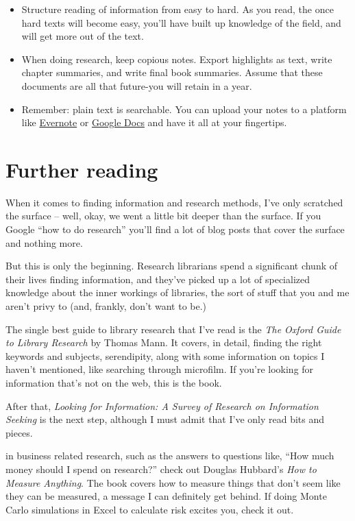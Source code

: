 \begin{itemize}
\item Structure reading of information from easy to hard. As you read, the once hard
texts will become easy, you'll have built up knowledge of the field, and will
get more out of the text.

\item When doing research, keep copious notes. Export highlights as text, write
chapter summaries, and write final book summaries. Assume that these documents
are all that future-you will retain in a year.

\item Remember: plain text is searchable. You can upload your notes to a platform
like \href{http://evernote.com/}{Evernote} or \href{http://docs.google.com}{Google Docs} and have it all at your fingertips.
\end{itemize}

\section{Further reading}

When it comes to finding information and research methods, I've only scratched
the surface -- well, okay, we went a little bit deeper than the surface. If you
Google ``how to do research'' you'll find a lot of blog posts that cover the
surface and nothing more.

But this is only the beginning. Research librarians spend a significant chunk of their
lives finding information, and they've picked up a lot of specialized
knowledge about the inner workings of libraries, the sort of stuff that you and
me aren't privy to (and, frankly, don't want to be.)

The single best guide to library research that I've read is the \textit{The
  Oxford Guide to Library Research} by Thomas Mann. It covers, in detail,
finding the right keywords and subjects, serendipity, along with some
information on topics I haven't mentioned, like searching through
microfilm. If you're looking for information that's not on the web, this is the
book.

After that, \textit{Looking for Information: A Survey of Research on Information
  Seeking} is the next step, although I must admit that I've only read bits and
pieces.

 in business related research, such as the
answers to questions like, ``How much money should I spend on research?'' check
out Douglas Hubbard's \textit{How to Measure Anything}. The book covers how to
measure things that don't seem like they can be measured, a message I can
definitely get behind. If doing Monte Carlo simulations in Excel to calculate
risk excites you, check it out.

